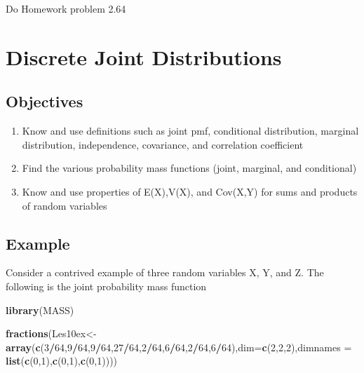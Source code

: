 \documentclass[]{book}
\newenvironment{Shaded}{\begin{snugshade}}{\end{snugshade}}
\newcommand{\KeywordTok}[1]{\textcolor[rgb]{0.13,0.29,0.53}{\textbf{#1}}}
\newcommand{\DataTypeTok}[1]{\textcolor[rgb]{0.13,0.29,0.53}{#1}}
\newcommand{\DecValTok}[1]{\textcolor[rgb]{0.00,0.00,0.81}{#1}}
\newcommand{\OperatorTok}[1]{\textcolor[rgb]{0.81,0.36,0.00}{\textbf{#1}}}
\newcommand{\NormalTok}[1]{#1}
\providecommand{\tightlist}{%
  \setlength{\itemsep}{0pt}\setlength{\parskip}{0pt}}
\theoremstyle{definition}
\theoremstyle{definition}
\theoremstyle{definition}
\theoremstyle{remark}
\begin{document}
Do Homework problem 2.64

\hypertarget{L10}{\section{Discrete Joint Distributions}\label{L10}}

\subsection{Objectives}\label{objectives-9}

\begin{enumerate}
\def\labelenumi{\arabic{enumi}.}
\tightlist
\item
  Know and use definitions such as joint pmf, conditional distribution,
  marginal distribution, independence, covariance, and correlation
  coefficient\\
\item
  Find the various probability mass functions (joint, marginal, and
  conditional)\\
\item
  Know and use properties of E(X),V(X), and Cov(X,Y) for sums and
  products of random variables
\end{enumerate}

\subsection{Example}\label{example}

Consider a contrived example of three random variables X, Y, and Z. The
following is the joint probability mass function

\begin{Shaded}
\begin{Highlighting}[]
\KeywordTok{library}\NormalTok{(MASS)}
\end{Highlighting}
\end{Shaded}

\begin{Shaded}
\begin{Highlighting}[]
\KeywordTok{fractions}\NormalTok{(Les10ex<-}\KeywordTok{array}\NormalTok{(}\KeywordTok{c}\NormalTok{(}\DecValTok{3}\OperatorTok{/}\DecValTok{64}\NormalTok{,}\DecValTok{9}\OperatorTok{/}\DecValTok{64}\NormalTok{,}\DecValTok{9}\OperatorTok{/}\DecValTok{64}\NormalTok{,}\DecValTok{27}\OperatorTok{/}\DecValTok{64}\NormalTok{,}\DecValTok{2}\OperatorTok{/}\DecValTok{64}\NormalTok{,}\DecValTok{6}\OperatorTok{/}\DecValTok{64}\NormalTok{,}\DecValTok{2}\OperatorTok{/}\DecValTok{64}\NormalTok{,}\DecValTok{6}\OperatorTok{/}\DecValTok{64}\NormalTok{),}\DataTypeTok{dim=}\KeywordTok{c}\NormalTok{(}\DecValTok{2}\NormalTok{,}\DecValTok{2}\NormalTok{,}\DecValTok{2}\NormalTok{),}\DataTypeTok{dimnames =} \KeywordTok{list}\NormalTok{(}\KeywordTok{c}\NormalTok{(}\DecValTok{0}\NormalTok{,}\DecValTok{1}\NormalTok{),}\KeywordTok{c}\NormalTok{(}\DecValTok{0}\NormalTok{,}\DecValTok{1}\NormalTok{),}\KeywordTok{c}\NormalTok{(}\DecValTok{0}\NormalTok{,}\DecValTok{1}\NormalTok{))))}
\end{Highlighting}
\end{Shaded}
\end{document}
